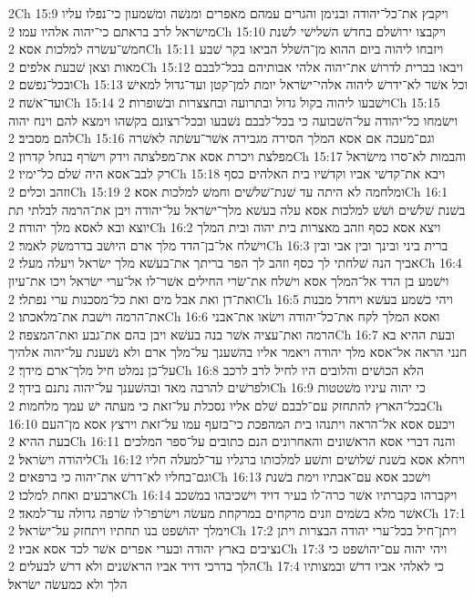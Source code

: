 2Ch 15:9  ויקבץ את־כל־יהודה ובנימן והגרים עמהם מאפרים ומנשׁה ומשׁמעון כי־נפלו עליו מישׂראל לרב בראתם כי־יהוה אלהיו עמו׃
2Ch 15:10  ויקבצו ירושׁלם בחדשׁ השׁלישׁי לשׁנת חמשׁ־עשׂרה למלכות אסא׃
2Ch 15:11  ויזבחו ליהוה ביום ההוא מן־השׁלל הביאו בקר שׁבע מאות וצאן שׁבעת אלפים׃
2Ch 15:12  ויבאו בברית לדרושׁ את־יהוה אלהי אבותיהם בכל־לבבם ובכל־נפשׁם׃
2Ch 15:13  וכל אשׁר לא־ידרשׁ ליהוה אלהי־ישׂראל יומת למן־קטן ועד־גדול למאישׁ ועד־אשׁה׃
2Ch 15:14  וישׁבעו ליהוה בקול גדול ובתרועה ובחצצרות ובשׁופרות׃
2Ch 15:15  וישׂמחו כל־יהודה על־השׁבועה כי בכל־לבבם נשׁבעו ובכל־רצונם בקשׁהו וימצא להם וינח יהוה להם מסביב׃
2Ch 15:16  וגם־מעכה אם אסא המלך הסירה מגבירה אשׁר־עשׂתה לאשׁרה מפלצת ויכרת אסא את־מפלצתה וידק וישׂרף בנחל קדרון׃
2Ch 15:17  והבמות לא־סרו מישׂראל רק לבב־אסא היה שׁלם כל־ימיו׃
2Ch 15:18  ויבא את־קדשׁי אביו וקדשׁיו בית האלהים כסף וזהב וכלים׃
2Ch 15:19  ומלחמה לא היתה עד שׁנת־שׁלשׁים וחמשׁ למלכות אסא׃
2Ch 16:1  בשׁנת שׁלשׁים ושׁשׁ למלכות אסא עלה בעשׁא מלך־ישׂראל על־יהודה ויבן את־הרמה לבלתי תת יוצא ובא לאסא מלך יהודה׃
2Ch 16:2  ויצא אסא כסף וזהב מאצרות בית יהוה ובית המלך וישׁלח אל־בן־הדד מלך ארם היושׁב בדרמשׂק לאמר׃
2Ch 16:3  ברית ביני ובינך ובין אבי ובין אביך הנה שׁלחתי לך כסף וזהב לך הפר בריתך את־בעשׁא מלך ישׂראל ויעלה מעלי׃
2Ch 16:4  וישׁמע בן הדד אל־המלך אסא וישׁלח את־שׂרי החילים אשׁר־לו אל־ערי ישׂראל ויכו את־עיון ואת־דן ואת אבל מים ואת כל־מסכנות ערי נפתלי׃
2Ch 16:5  ויהי כשׁמע בעשׁא ויחדל מבנות את־הרמה וישׁבת את־מלאכתו׃
2Ch 16:6  ואסא המלך לקח את־כל־יהודה וישׂאו את־אבני הרמה ואת־עציה אשׁר בנה בעשׁא ויבן בהם את־גבע ואת־המצפה׃
2Ch 16:7  ובעת ההיא בא חנני הראה אל־אסא מלך יהודה ויאמר אליו בהשׁענך על־מלך ארם ולא נשׁענת על־יהוה אלהיך על־כן נמלט חיל מלך־ארם מידך׃
2Ch 16:8  הלא הכושׁים והלובים היו לחיל לרב לרכב ולפרשׁים להרבה מאד ובהשׁענך על־יהוה נתנם בידך׃
2Ch 16:9  כי יהוה עיניו משׁטטות בכל־הארץ להתחזק עם־לבבם שׁלם אליו נסכלת על־זאת כי מעתה ישׁ עמך מלחמות׃
2Ch 16:10  ויכעס אסא אל־הראה ויתנהו בית המהפכת כי־בזעף עמו על־זאת וירצץ אסא מן־העם בעת ההיא׃
2Ch 16:11  והנה דברי אסא הראשׁונים והאחרונים הנם כתובים על־ספר המלכים ליהודה וישׂראל׃
2Ch 16:12  ויחלא אסא בשׁנת שׁלושׁים ותשׁע למלכותו ברגליו עד־למעלה חליו וגם־בחליו לא־דרשׁ את־יהוה כי ברפאים׃
2Ch 16:13  וישׁכב אסא עם־אבתיו וימת בשׁנת ארבעים ואחת למלכו׃
2Ch 16:14  ויקברהו בקברתיו אשׁר כרה־לו בעיר דויד וישׁכיבהו במשׁכב אשׁר מלא בשׂמים וזנים מרקחים במרקחת מעשׂה וישׂרפו־לו שׂרפה גדולה עד־למאד׃
2Ch 17:1  וימלך יהושׁפט בנו תחתיו ויתחזק על־ישׂראל׃
2Ch 17:2  ויתן־חיל בכל־ערי יהודה הבצרות ויתן נציבים בארץ יהודה ובערי אפרים אשׁר לכד אסא אביו׃
2Ch 17:3  ויהי יהוה עם־יהושׁפט כי הלך בדרכי דויד אביו הראשׁנים ולא דרשׁ לבעלים׃
2Ch 17:4  כי לאלהי אביו דרשׁ ובמצותיו הלך ולא כמעשׂה ישׂראל׃

